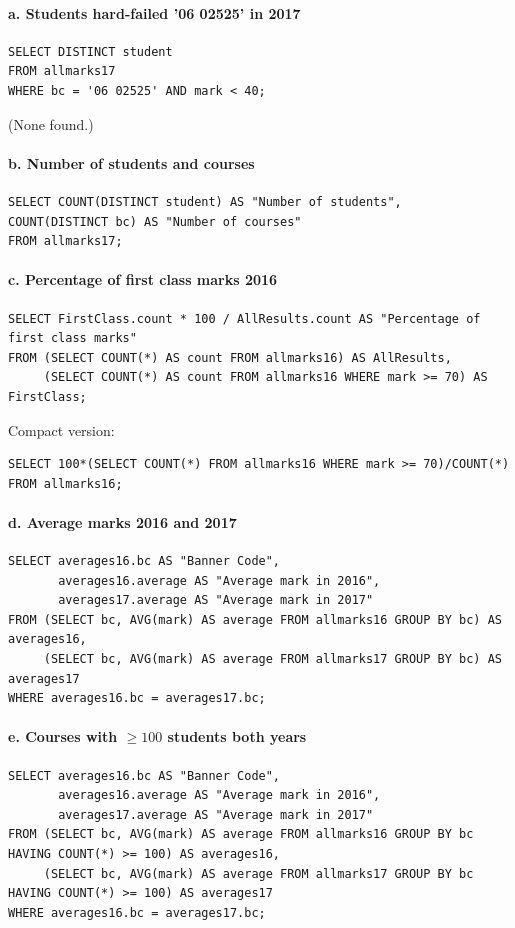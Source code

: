 \paragraph{a. Students hard-failed '06 02525' in 2017}
\begin{verbatim}
SELECT DISTINCT student
FROM allmarks17
WHERE bc = '06 02525' AND mark < 40;
\end{verbatim}
(None found.)

\paragraph{b. Number of students and courses}
\begin{verbatim}
SELECT COUNT(DISTINCT student) AS "Number of students",
COUNT(DISTINCT bc) AS "Number of courses"
FROM allmarks17;
\end{verbatim}

\paragraph{c. Percentage of first class marks 2016}
\begin{verbatim}
SELECT FirstClass.count * 100 / AllResults.count AS "Percentage of first class marks"
FROM (SELECT COUNT(*) AS count FROM allmarks16) AS AllResults,
     (SELECT COUNT(*) AS count FROM allmarks16 WHERE mark >= 70) AS FirstClass;
\end{verbatim}

Compact version:
\begin{verbatim}
SELECT 100*(SELECT COUNT(*) FROM allmarks16 WHERE mark >= 70)/COUNT(*)
FROM allmarks16;
\end{verbatim}

\paragraph{d. Average marks 2016 and 2017}
\begin{verbatim}
SELECT averages16.bc AS "Banner Code",
       averages16.average AS "Average mark in 2016",
       averages17.average AS "Average mark in 2017"
FROM (SELECT bc, AVG(mark) AS average FROM allmarks16 GROUP BY bc) AS averages16,
     (SELECT bc, AVG(mark) AS average FROM allmarks17 GROUP BY bc) AS averages17
WHERE averages16.bc = averages17.bc;
\end{verbatim}

\paragraph{e. Courses with $\geq 100$ students both years}
\begin{lstlisting}
SELECT averages16.bc AS "Banner Code",
       averages16.average AS "Average mark in 2016",
       averages17.average AS "Average mark in 2017"
FROM (SELECT bc, AVG(mark) AS average FROM allmarks16 GROUP BY bc HAVING COUNT(*) >= 100) AS averages16,
     (SELECT bc, AVG(mark) AS average FROM allmarks17 GROUP BY bc HAVING COUNT(*) >= 100) AS averages17
WHERE averages16.bc = averages17.bc;
\end{lstlisting}